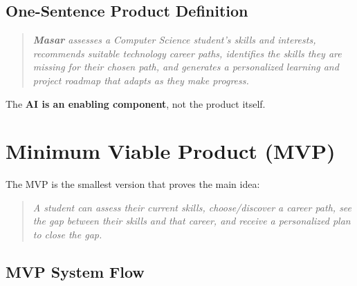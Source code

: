 \documentclass[12pt,a4paper]{article}
\begin{document}
\subsection{One-Sentence Product Definition}
\begin{quote}
\textit{\textbf{Masar} assesses a Computer Science student's skills and interests, recommends suitable technology career paths, identifies the skills they are missing for their chosen path, and generates a personalized learning and project roadmap that adapts as they make progress.}
\end{quote}

\noindent The \textbf{AI is an enabling component}, not the product itself.

\newpage

\section{Minimum Viable Product (MVP)}

The MVP is the smallest version that proves the main idea:
\begin{quote}
\textit{A student can assess their current skills, choose/discover a career path, see the gap between their skills and that career, and receive a personalized plan to close the gap.}
\end{quote}

\subsection{MVP System Flow}
\end{document}
